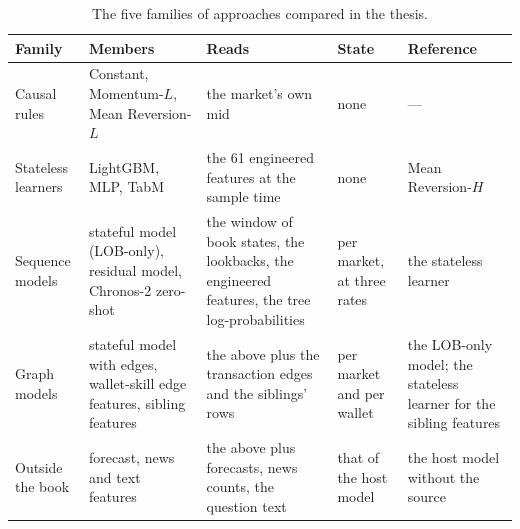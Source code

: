 \begin{table}[t]
\centering
\caption{The five families of approaches compared in the thesis.}
\label{tab:models:families}
\small
\begin{tabular}{p{1.9cm}p{3.0cm}p{3.9cm}p{1.8cm}p{2.6cm}}
\toprule
Family & Members & Reads & State & Reference \\
\midrule
Causal rules & Constant, Momentum-$L$, Mean Reversion-$L$ & the market's own mid & none & --- \\
Stateless learners & LightGBM, MLP, TabM & the 61 engineered features at the sample time & none & Mean Reversion-$H$ \\
Sequence models & stateful model (LOB-only), residual model, Chronos-2 zero-shot & the window of book states, the lookbacks, the engineered features, the tree log-probabilities & per market, at three rates & the stateless learner \\
Graph models & stateful model with edges, wallet-skill edge features, sibling features & the above plus the transaction edges and the siblings' rows & per market and per wallet & the LOB-only model; the stateless learner for the sibling features \\
Outside the book & forecast, news and text features & the above plus forecasts, news counts, the question text & that of the host model & the host model without the source \\
\bottomrule
\end{tabular}
\end{table}

